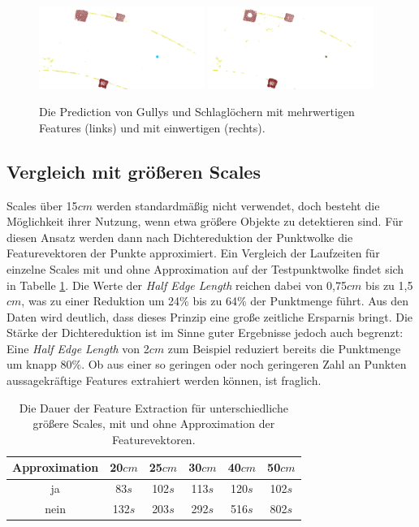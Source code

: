 \begin{figure}
    {\includegraphics[width=0.48\textwidth]{graphics/eval_gully_pothole_prediction}}
    {\includegraphics[width=0.48\textwidth]{graphics/eval_gully_pothole_absolute}}
    \caption{Die Prediction von Gullys und Schlaglöchern mit mehrwertigen Features (links) und mit einwertigen (rechts).}
    \label{fig:cmp_absolute_detail}
\end{figure}

\subsection{Vergleich mit größeren Scales}

Scales über 15$cm$ werden standardmäßig nicht verwendet, doch besteht die Möglichkeit ihrer Nutzung, wenn etwa größere Objekte zu detektieren sind. Für diesen Ansatz werden dann nach Dichtereduktion der Punktwolke die Featurevektoren der Punkte approximiert. Ein Vergleich der Laufzeiten für einzelne Scales mit und ohne Approximation auf der Testpunktwolke findet sich in Tabelle \ref{table:bigger_scales}. Die Werte der \textit{Half Edge Length} reichen dabei von 0,75$cm$ bis zu 1,5$cm$, was zu einer Reduktion um 24\% bis zu 64\% der Punktmenge führt. Aus den Daten wird deutlich, dass dieses Prinzip eine große zeitliche Ersparnis bringt. Die Stärke der Dichtereduktion ist im Sinne guter Ergebnisse jedoch auch begrenzt: Eine \textit{Half Edge Length} von 2$cm$ zum Beispiel reduziert bereits die Punktmenge um knapp 80\%. Ob aus einer so geringen oder noch geringeren Zahl an Punkten aussagekräftige Features extrahiert werden können, ist fraglich. \\ 

\begin{table}
\centering
\begin{tabular}{c|c|c|c|c|c}
Approximation & 20$cm$ & 25$cm$ & 30$cm$ & 40$cm$ & 50$cm$ \\
\hline
ja   & 83$s$ & 102$s$ & 113$s$ & 120$s$ & 102$s$ \\
nein & 132$s$ & 203$s$ & 292$s$ & 516$s$ & 802$s$ \\
\end{tabular}
\caption{Die Dauer der Feature Extraction für unterschiedliche größere Scales, mit und ohne Approximation der Featurevektoren.}
\label{table:bigger_scales}
\end{table}

